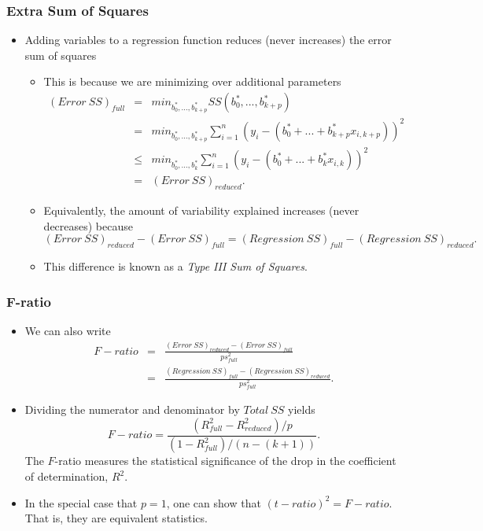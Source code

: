 \begin{frame}[shrink=2]
 \frametitle{Extra Sum of Squares}
   \begin{itemize}
 \item Adding variables to a regression function reduces (never
 increases) the error sum of squares
   \begin{itemize}
\item This is because we are minimizing over additional parameters
\begin{eqnarray*}
(Error~SS)_{full} &=& min_{b_0^{\ast}, \ldots, b_{k+p}^{\ast}}
SS(b_{0}^{\ast },...,b_{k+p}^{\ast }) \\
&=& min_{b_0^{\ast}, \ldots,
b_{k+p}^{\ast}}\sum_{i=1}^{n}\left( y_{i}-\left( b_{0}^{\ast
}+...+b_{k+p}^{\ast }x_{i,k+p}\right) \right)
^{2} \\
&\leq& min_{b_0^{\ast}, \ldots, b_{k}^{\ast}}\sum_{i=1}^{n}\left(
y_{i}-\left( b_{0}^{\ast }+...+b_k^{\ast }x_{i,k}\right) \right)
^{2} \\
&=& (Error~SS)_{reduced}.
\end{eqnarray*}
\item Equivalently, the amount of variability explained increases
(never decreases) because 
\begin{equation*}
(Error~SS)_{reduced}-(Error~SS)_{full}=(Regression~SS)_{full}-(Regression~SS)_{reduced}.
\end{equation*} 
\item This difference is known as a \emph{Type III Sum of Squares}.
 \end{itemize}
 \end{itemize}
\end{frame}

\begin{frame}[shrink=2]
 \frametitle{F-ratio}
   \begin{itemize}
 \item We can also write
 \begin{eqnarray*}
F-ratio &=&
\frac{(Error~SS)_{reduced}-(Error~SS)_{full}}{ps_{full}^{2}} \\
&=&
\frac{(Regression~SS)_{full}-(Regression~SS)_{reduced}}{ps_{full}^{2}}.
\end{eqnarray*}
\item Dividing the numerator and denominator by $Total~SS$ yields
\begin{equation*}
F-ratio=\frac{\left( R_{full}^{2}-R_{reduced}^{2}\right) /p}{\left(
1-R_{full}^{2}\right) /(n-(k+1))}.
\end{equation*}%
The $F$-ratio measures the statistical significance of the drop in
the coefficient of determination, $R^{2}$.
\item In the special case that $p=1$, one can show that
$(t-ratio)^{2}=F-ratio$. That is, they are equivalent statistics.
  \end{itemize}
\end{frame}



